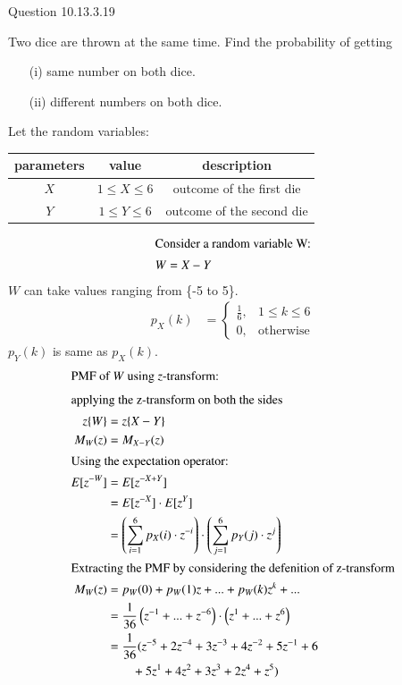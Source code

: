 \documentclass[journal,12pt,twocolumn]{IEEEtran}
\theoremstyle{remark}
\begin{document}
Question 10.13.3.19

Two dice are thrown at the same time. Find the probability of getting
\begin{enumerate}
    \item[(i)] same number on both dice.
    \item[(ii)] different numbers on both dice.
\end{enumerate}
\solution
Let the random variables:
\begin{table}[!ht]
\begin{tabular}{|c|c|c|}
	\hline
	\textbf{parameters} & \textbf{value} & \textbf{description}\\
	\hline
	$X$ & $1 \leq X \leq 6$ & outcome of the first die \\
	\hline
	$Y$ & $1\leq Y \leq 6$ & outcome of the second die\\
	\hline
\end{tabular}
\end{table}
\begin{align}
\intertext{Consider a random variable W:}
W &= X-Y
\end{align}
$W$ can take values ranging from \{-5 to 5\}.
\begin{align}
p_X(k) &= 
	\begin{cases}
		\frac{1}{6}, & 1 \leq k \leq 6 \\
		0, & \text{otherwise}
	\end{cases}
\end{align}
$p_Y(k)$ is same as $p_X(k)$.
\begin{align}
\intertext{PMF of $W$ using $z$-transform:}
	\intertext{applying the z-transform on both the sides}
	z\{W\} &= z\{X-Y\}\\
	M_W(z) &= M_{X-Y}(z)\\
	\intertext{Using the expectation operator:}
	E[z^{-W}] &= E[z^{-X+Y}]\\
	&= E[z^{-X}]\cdot E[z^{Y}]\\
	&= \left(\sum^6_{i=1}p_X(i)\cdot z^{-i}\right)\cdot\left(\sum^6_{j=1}p_Y(j)\cdot z^{j}\right)\\
	\intertext{Extracting the PMF by considering the defenition of z-transform}
	M_W(z) &= p_W(0) +p_W(1)z + ... + p_W(k)z^k + ...\\
	&= \frac{1}{36}\left(z^{-1}+...+z^{-6}\right)\cdot\left(z^{1}+...+z^{6}\right)\\
	&= \frac{1}{36}(z^{-5}+2z^{-4}+3z^{-3}+4z^{-2}+5z^{-1}+6\nonumber\\&\qquad+5z^{1}+4z^{2}+3z^{3}+2z^{4}+z^{5})
\end{align}
\end{document}
